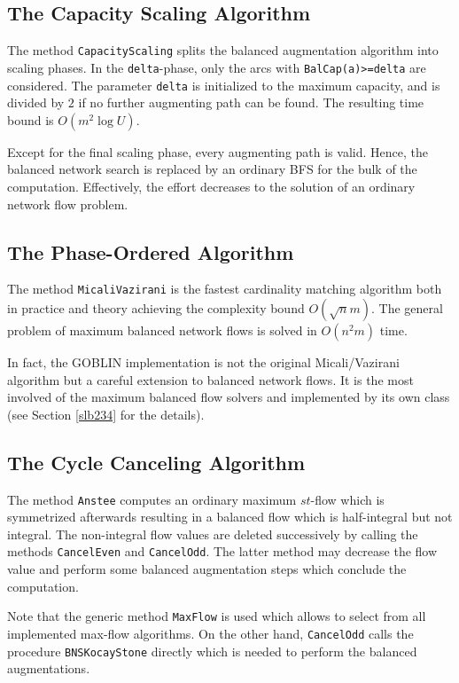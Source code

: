 \documentclass[a4paper,11pt,twoside]{book}
\begin{document}
\begin{multicols}{2}
\subsection{The Capacity Scaling Algorithm}
The method \verb/CapacityScaling/ splits the balanced augmentation algorithm
into scaling phases. In the \verb/delta/-phase, only the arcs with
\verb/BalCap(a)>=delta/ are considered. The parameter \verb/delta/ is
initialized to the maximum capacity, and is divided by $2$ if no further
augmenting path can be found. The resulting time bound is $O(m^2\log{U})$.

Except for the final scaling phase, every augmenting path is valid. Hence, the
balanced network search is replaced by an ordinary BFS for the bulk of the
computation. Effectively, the effort decreases to the solution of an ordinary
network flow problem.


\subsection{The Phase-Ordered Algorithm}
The method \verb/MicaliVazirani/ is the fastest cardinality matching algorithm
both in practice and theory achieving the complexity bound $O(\sqrt{n}m)$.
The general problem of maximum balanced network flows is solved in $O(n^2m)$
time.

In fact, the GOBLIN implementation is not the original Micali/Vazirani
algorithm but a careful extension to balanced network flows. It is the most
involved of the maximum balanced flow solvers and implemented by its own class
(see Section \ref{slb234} for the details).


\subsection{The Cycle Canceling Algorithm}
\label{slb_cancel}
The method \verb/Anstee/ computes an ordinary maximum $st$-flow which is
symmetrized afterwards resulting in a balanced flow which is half-integral
but not integral. The non-integral flow values are deleted successively by
calling the methods \verb/CancelEven/ and \verb/CancelOdd/. The latter method
may decrease the flow value and perform some balanced augmentation steps which 
conclude the computation.

Note that the generic method \verb/MaxFlow/ is used which allows to select from
all implemented max-flow algorithms. On the other hand, \verb/CancelOdd/ calls
the procedure \verb/BNSKocayStone/ directly which is needed to perform the
balanced augmentations.


\end{multicols}
\end{document}
